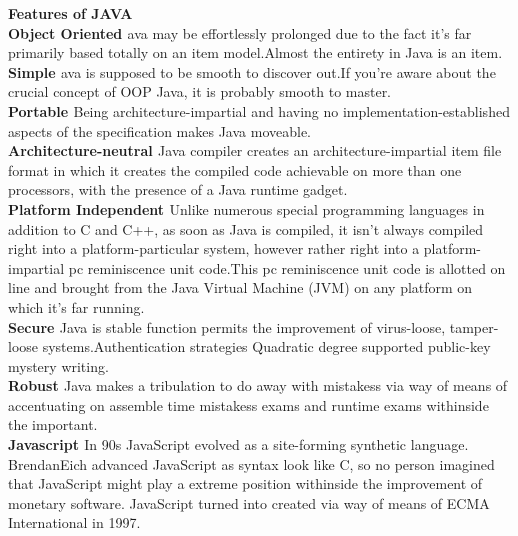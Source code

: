 \documentclass[12pt,a4paper]{article}
\begin{document}
\vspace{0.1in}
\textbf{\large{Features of JAVA}}\\

\textbf{\large{Object Oriented }} ava may be effortlessly prolonged due to the fact it's far primarily based totally on an item model.Almost
the entirety in Java is an item.\\

\textbf{\large{Simple }} ava is supposed to be smooth to discover out.If you’re aware about the crucial concept of OOP
Java, it is probably smooth to master.\\

\textbf{\large{Portable }} Being architecture-impartial and having no implementation-established aspects
of the specification makes Java moveable.\\

\textbf{\large{Architecture-neutral }} Java compiler creates an architecture-impartial item file
format in which it creates the compiled code achievable on more than one processors, with the presence of a
Java runtime gadget.\\

\textbf{\large{Platform Independent }} Unlike numerous special programming languages in addition to C
and C++, as soon as Java is compiled, it isn't always compiled right into a platform-particular system, however rather
right into a platform-impartial pc reminiscence unit code.This pc reminiscence unit code is
allotted on line and brought from the Java Virtual Machine (JVM) on any platform on which it's far
running.\\

\textbf{\large{Secure }} Java is stable function permits the improvement of virus-loose, tamper-loose systems.Authentication strategies Quadratic degree supported public-key mystery writing.\\

\textbf{\large{Robust  }} Java makes a tribulation to do away with mistakess via way of means of accentuating on assemble time mistakess exams
and runtime exams withinside the important.\\

\textbf{\large{Javascript }} In 90s JavaScript evolved as a site-forming synthetic language. BrendanEich advanced JavaScript as syntax look like C, so no person imagined that JavaScript might play a
extreme position withinside the improvement of monetary software. JavaScript turned into created via way of means of ECMA International in 1997.\\
\end{document}
